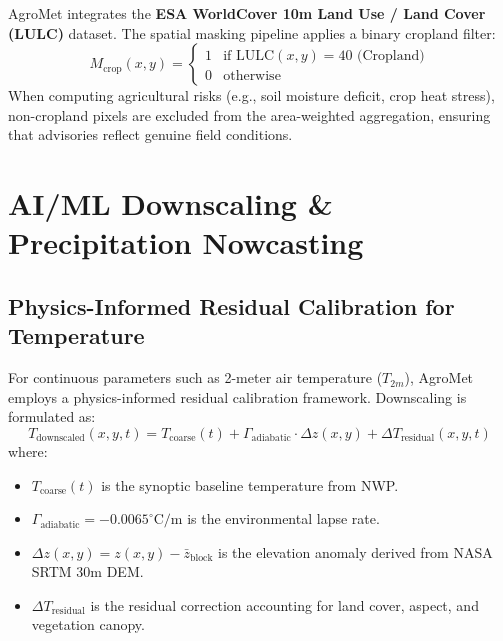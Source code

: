 \documentclass[11pt,a4paper,oneside]{report}
\begin{document}
AgroMet integrates the \textbf{ESA WorldCover 10m Land Use / Land Cover (LULC)} dataset. The spatial masking pipeline applies a binary cropland filter:
\begin{equation}
M_{\text{crop}}(x,y) = \begin{cases} 1 & \text{if } \text{LULC}(x,y) = 40 \text{ (Cropland)} \\ 0 & \text{otherwise} \end{cases}
\end{equation}
When computing agricultural risks (e.g., soil moisture deficit, crop heat stress), non-cropland pixels are excluded from the area-weighted aggregation, ensuring that advisories reflect genuine field conditions.

\chapter{AI/ML Downscaling \& Precipitation Nowcasting}

\section{Physics-Informed Residual Calibration for Temperature}
For continuous parameters such as 2-meter air temperature ($T_{2m}$), AgroMet employs a physics-informed residual calibration framework. Downscaling is formulated as:
\begin{equation}
T_{\text{downscaled}}(x,y,t) = T_{\text{coarse}}(t) + \Gamma_{\text{adiabatic}} \cdot \Delta z(x,y) + \Delta T_{\text{residual}}(x,y,t)
\end{equation}
where:
\begin{itemize}[leftmargin=*]
    \item $T_{\text{coarse}}(t)$ is the synoptic baseline temperature from NWP.
    \item $\Gamma_{\text{adiabatic}} = -0.0065^\circ\text{C}/\text{m}$ is the environmental lapse rate.
    \item $\Delta z(x,y) = z(x,y) - \bar{z}_{\text{block}}$ is the elevation anomaly derived from NASA SRTM 30m DEM.
    \item $\Delta T_{\text{residual}}$ is the residual correction accounting for land cover, aspect, and vegetation canopy.
\end{itemize}
\end{document}
